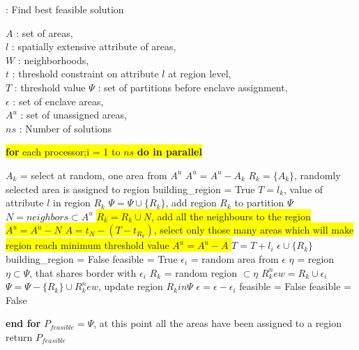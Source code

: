 \documentclass[conference]{IEEEtran}
\begin{document}
\begin{algorithm}
\scriptsize
\caption{: Find best feasible solution~\cite{r1}}
$A$ : set of areas,\\
$l$ : spatially extensive attribute of areas,\\
$W$ : neighborhoods,\\
$t$ : threshold constraint on attribute $l$ at region level,\\
$T$ : threshold value
$\Psi$ : set of partitions before enclave assignment,\\
$\epsilon$ : set of enclave areas,\\
$A^u$ : set of unassigned areas,\\
$ns$ : Number of solutions\\
\begin{algorithmic}
\vbox{\colorbox{yellow}{\vbox{\STATE \textbf{for} each processor;i = 1 to $ns$ \textbf{do in parallel}}}} 
\begin{ALC@g}
		\STATE $A_k$ = select at random, one area from $A^u$
		\STATE $A^u = A^u - A_k$
		\STATE $R_k = \{A_k\}$, randomly selected area is assigned to region
		\STATE building\_region = True
		\STATE $T = l_k$, value of attribute $l$ in region $R_k$
				\STATE $\Psi = \Psi \cup \{R_k\}$, add region $R_k$ to partition $\Psi$
			\ELSE
				\STATE $N = neighbors \subset A^u$%
					\vbox{\colorbox{yellow}{\vbox{
						\STATE $R_k = R_k \cup N$, add all the neighbours to the region 
						\STATE $A^u = A^u - N$
					\ELSE
						\STATE $A = t_N - (T - t_{R_k})$, select only those many areas which will make region reach minimum threshold value
						\STATE $A^u = A^u - A$
					\ENDIF}}}
					\STATE $T = T + l_i$
				\ELSE
					\STATE $\epsilon \cup \{R_k\}$
					\STATE building\_region = False
				\ENDIF
			\ENDIF
		\ENDWHILE
	\ENDWHILE
		\STATE feasible = True
			\STATE $\epsilon_i$ = random area from $\epsilon$
			\STATE $\eta$ = region $\eta \subset \Psi $, that shares border with $\epsilon_i$
				\STATE $R_k$ = random region $\subset \eta$
				\STATE $R_k^new = R_k \cup \epsilon_i$
				\STATE $\Psi = \Psi - \{R_k\} \cup R_k^new$, update region $R_k in \Psi$
				\STATE $\epsilon = \epsilon - \epsilon_i$
			\ELSE
				\STATE feasible = False
			\ENDIF
		\ENDWHILE
	\ELSE
		\STATE feasible = False
	\ENDIF
\end{ALC@g}
\STATE \textbf{end for}
\STATE $P_{feasible} = \Psi$, at this point all the areas have been assigned to a region
\STATE return $P_{feasible}$
\end{algorithmic}
\end{algorithm}
\end{document}
